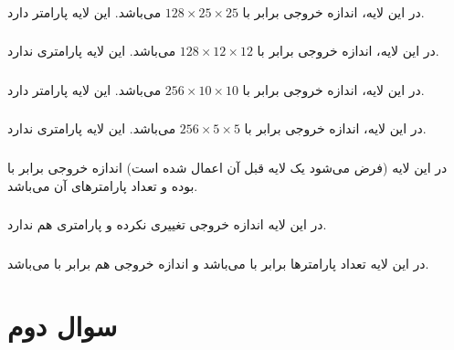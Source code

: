 \documentclass[12pt]{article}
\begin{document}
	\subsubsection{}
	در این لایه، اندازه خروجی برابر با $128\times25\times25$ می‌باشد. این لایه  پارامتر دارد.
	\subsubsection{}
	در این لایه، اندازه خروجی برابر با $128\times12\times12$ می‌باشد. این لایه پارامتری ندارد.
	\subsubsection{}
	در این لایه، اندازه خروجی برابر با $256\times10\times10$ می‌باشد. این لایه  پارامتر دارد.
	\subsubsection{}
	در این لایه، اندازه خروجی برابر با $256\times5\times5$ می‌باشد. این لایه پارامتری ندارد.
	\subsubsection{}
	در این لایه (فرض می‌شود یک لایه  قبل آن اعمال شده است) اندازه خروجی برابر با  بوده و تعداد پارامترهای آن  می‌باشد. 
	\subsubsection{}
	در این لایه اندازه خروجی تغییری نکرده و پارامتری هم ندارد.
	\subsubsection{}
	در این لایه تعداد پارامترها برابر با  می‌باشد و اندازه خروجی هم برابر با  می‌باشد.
	
	\section{سوال دوم}
\end{document}
